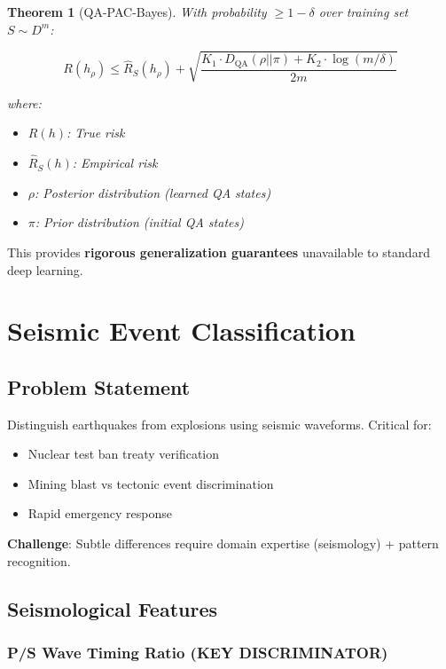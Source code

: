 \documentclass[11pt]{article}
\newtheorem{theorem}{Theorem}[section]
\theoremstyle{remark}
\begin{document}
\begin{theorem}[QA-PAC-Bayes]
\label{thm:qa_pac_bayes}
With probability $\geq 1-\delta$ over training set $S \sim D^m$:

\begin{equation}
R(h_\rho) \leq \hat{R}_S(h_\rho) + \sqrt{\frac{K_1 \cdot D_{\text{QA}}(\rho||\pi) + K_2 \cdot \log(m/\delta)}{2m}}
\end{equation}

where:
\begin{itemize}
\item $R(h)$: True risk
\item $\hat{R}_S(h)$: Empirical risk
\item $\rho$: Posterior distribution (learned QA states)
\item $\pi$: Prior distribution (initial QA states)
\end{itemize}
\end{theorem}

This provides \textbf{rigorous generalization guarantees} unavailable to standard deep learning.

\section{Seismic Event Classification}

\subsection{Problem Statement}

Distinguish earthquakes from explosions using seismic waveforms. Critical for:
\begin{itemize}
\item Nuclear test ban treaty verification
\item Mining blast vs tectonic event discrimination
\item Rapid emergency response
\end{itemize}

\textbf{Challenge}: Subtle differences require domain expertise (seismology) + pattern recognition.

\subsection{Seismological Features}

\subsubsection{P/S Wave Timing Ratio (KEY DISCRIMINATOR)}
\end{document}
